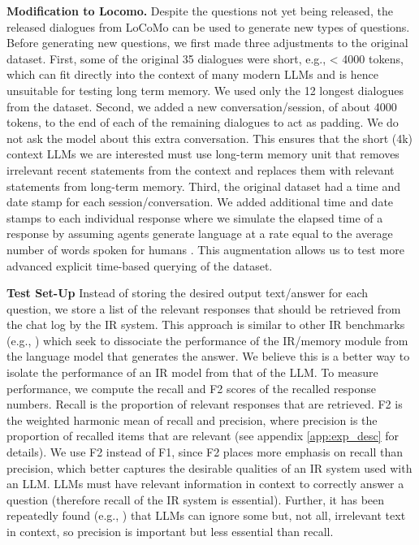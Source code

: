 \documentclass{article}
\begin{document}
\textbf{Modification to Locomo.} Despite the questions not yet being released, the released dialogues from LoCoMo can be used to generate new types of questions. Before generating new questions, we first made three adjustments to the original dataset. First, some of the original 35 dialogues were short, e.g.,  < 4000 tokens, which can fit directly into the context of many modern LLMs and is hence unsuitable for testing long term memory. We used only the 12 longest dialogues from the dataset. Second, we added a new conversation/session, of about 4000 tokens, to the end of each of the remaining dialogues to act as padding. We do not ask the model about this extra conversation. This ensures that the short (4k) context LLMs we are interested must use long-term memory unit that removes irrelevant recent statements from the context and replaces them with relevant statements from long-term memory. Third, the original dataset had a time and date stamp for each session/conversation. We added additional time and date stamps to each individual response where we simulate the elapsed time of a response by assuming agents generate language at a rate equal to the average number of words spoken for humans \cite{tauroza1990speech}. This augmentation allows us to test more advanced explicit time-based querying of the dataset.

\textbf{Test Set-Up} Instead of storing the desired output text/answer for each question, we store a list of the relevant responses that should be retrieved from the chat log by the IR system. This approach is similar to other IR benchmarks (e.g., \cite{dalton2021cast, dalton2020trec}) which seek to dissociate the performance of the IR/memory module from the language model that generates the answer. We believe this is a better way to isolate the performance of an IR model from that of the LLM. To measure performance, we compute the recall and F2 scores of the recalled response numbers. Recall is the proportion of relevant responses that are retrieved. F2 is the weighted harmonic mean of recall and precision, where precision is the proportion of recalled items that are relevant (see appendix \ref{app:exp_desc} for details). We use F2 instead of F1, since F2 places more emphasis on recall than precision, which better captures the desirable qualities of an IR system used with an LLM. LLMs must have relevant information in context to correctly answer a question (therefore recall of the IR system is essential). Further, it has been repeatedly found (e.g., \cite{maharana2024evaluating, goodai_benchmark2023, levy2024same}) that LLMs can ignore some but, not all, irrelevant text in context, so precision is important but less essential than recall.
\end{document}
